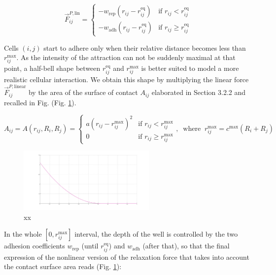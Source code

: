 $$\vec{F}^{P,\mathrm{lin}}_{ij} = \begin{cases} - w_{\mathrm{rep}}(r_{ij}-r^{\mathrm{eq}}_{ij}) & \text{if }r_{ij} \lt r^{\mathrm{eq}}_{ij} \\ - w_{\mathrm{adh}}(r_{ij}-r^{\mathrm{eq}}_{ij}) & \text{if }r_{ij} \geq r^{\mathrm{eq}}_{ij} \end{cases}$$

Cells $(i,j)$ start to adhere only when their relative distance becomes less than $r^{\mathrm{max}}_{ij}$. As the intensity of the attraction can not be suddenly maximal at that point, a half-bell shape between $r^{\mathrm{eq}}_{ij}$ and $r^{\mathrm{max}}_{ij}$ is better suited to model a more realistic cellular interaction. We obtain this shape by multiplying the linear force $\vec{F}^{P,\mathrm{linear}}_{ij}$ by the area of the surface of contact $A_{ij}$ elaborated in Section 3.2.2 and recalled in Fig. (Fig. \ref{potential_potential_surface}).

$$A_{ij} = A(r_{ij},R_i,R_j) = \begin{cases} a\left(r_{ij} - r^{\mathrm{max}}_{ij}\right)^2 &     \text{if }r_{ij} \lt r^{\mathrm{max}}_{ij} \\ 0 & \text{if }r_{ij} \geq r^{\mathrm{max}}_{ij} \end{cases}, \;\;\text{where}\;\; r^{\mathrm{max}}_{ij} = c^{\mathrm{max}}(R_i+R_j)$$
\begin{figure}
\begin{center}
\includegraphics[width=0.6\textwidth]{../../images/MECAGEN/potential/potential_surface.png}
\end{center}
\caption{xx}
\label{potential_potential_surface}
\end{figure}

In the whole $[0,r^{\mathrm{max}}_{ij}]$ interval, the depth of the well is controlled by the two adhesion coefficients $w_{\mathrm{rep}}$ (until $r^{\mathrm{eq}}_{ij}$) and $w_{\mathrm{adh}}$ (after that), so that the final expression of the nonlinear version of the relaxation force that takes into account the contact surface area reads (Fig. \ref{potential_potential_surface}):  

